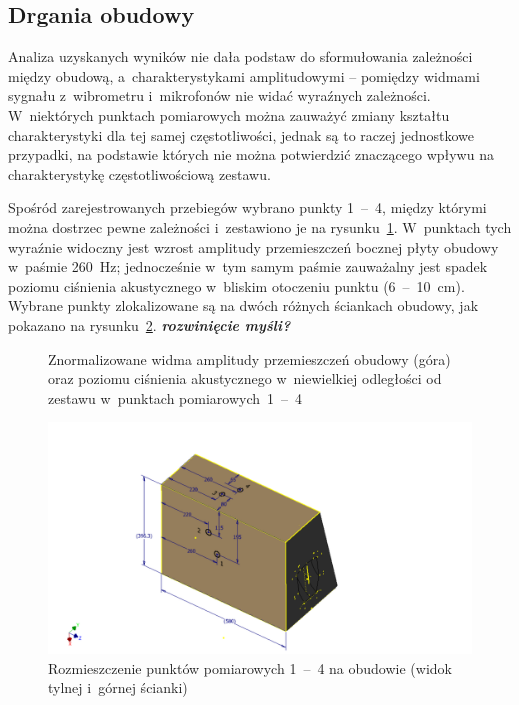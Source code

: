 \documentclass[12pt]{oska}
\newcommand{\range}[2]{\num{#1}~--~\num{#2}}
\newcommand{\comment}[1]{{\color{magenta}\emph{\textbf{#1}}}}
\begin{document}
	
	\subsection{Drgania obudowy}
		
		Analiza uzyskanych wyników nie dała podstaw do sformułowania zależności między obudową, a~charakterystykami amplitudowymi -- pomiędzy widmami sygnału z~wibrometru i~mikrofonów nie widać wyraźnych zależności. W~niektórych punktach pomiarowych można zauważyć zmiany kształtu charakterystyki dla tej samej częstotliwości, jednak są to raczej jednostkowe przypadki, na podstawie których nie można potwierdzić znaczącego wpływu na charakterystykę częstotliwościową zestawu.
		
		Spośród zarejestrowanych przebiegów wybrano punkty \range{1}{4}, między którymi można dostrzec pewne zależności i~zestawiono je na rysunku~\ref{r:wibrometr_1-4}. W~punktach tych wyraźnie widoczny jest wzrost amplitudy przemieszczeń bocznej płyty obudowy w~paśmie \SI{260}{\hertz}; jednocześnie w~tym samym paśmie zauważalny jest spadek poziomu ciśnienia akustycznego w~bliskim otoczeniu punktu (\range{6}{10}~\si{\cm}). Wybrane punkty zlokalizowane są na dwóch różnych ściankach obudowy, jak pokazano na rysunku~\ref{r:wibro_pkt}.  \comment{rozwinięcie myśli?}
		
		\begin{figure}[!ht]
			\centering
			\caption{Znormalizowane widma amplitudy przemieszczeń obudowy (góra) oraz poziomu ciśnienia akustycznego w~niewielkiej odległości od zestawu w~punktach pomiarowych~\range{1}{4}}
			\label{r:wibrometr_1-4}
		\end{figure}
		
		\begin{figure}[!ht]
			\centering
			\includegraphics[width=.8\textwidth,trim={5cm .3cm 5cm 2.7cm},clip]{wibrometr.pdf}
			\caption{Rozmieszczenie punktów pomiarowych \range{1}{4} na obudowie (widok tylnej i~górnej ścianki)}
			\label{r:wibro_pkt}
		\end{figure}
		
\end{document}

